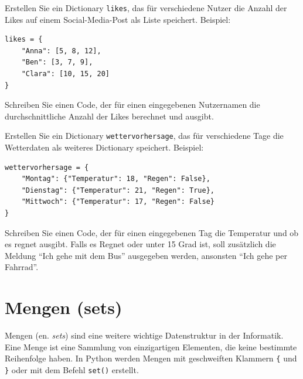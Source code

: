 \begin{myexercise}
	Erstellen Sie ein Dictionary \lstinline|likes|, das für verschiedene Nutzer die Anzahl der Likes auf einem Social-Media-Post als Liste speichert. Beispiel:
	\begin{lstlisting}
likes = {
	"Anna": [5, 8, 12],
	"Ben": [3, 7, 9],
	"Clara": [10, 15, 20]
}
\end{lstlisting}
	Schreiben Sie einen Code, der für einen eingegebenen Nutzernamen die durchschnittliche Anzahl der Likes berechnet und ausgibt.
	\begin{myanswer}
		
	\end{myanswer}
\end{myexercise}

\begin{myexercise}
	Erstellen Sie ein Dictionary \lstinline|wettervorhersage|, das für verschiedene Tage die Wetterdaten als weiteres Dictionary speichert. Beispiel:
	\begin{lstlisting}
wettervorhersage = {
	"Montag": {"Temperatur": 18, "Regen": False},
	"Dienstag": {"Temperatur": 21, "Regen": True},
	"Mittwoch": {"Temperatur": 17, "Regen": False}
}
\end{lstlisting}
	Schreiben Sie einen Code, der für einen eingegebenen Tag die Temperatur und ob es regnet ausgibt. Falls es Regnet oder unter 15 Grad ist, soll zusätzlich die Meldung \enquote{Ich gehe mit dem Bus} ausgegeben werden, ansonsten \enquote{Ich gehe per Fahrrad}.
	\begin{myanswer}
		
	\end{myanswer}
\end{myexercise}

\clearpage
\section{Mengen (sets)}
Mengen (en. \textit{sets}) sind eine weitere wichtige Datenstruktur in der Informatik. Eine Menge ist eine Sammlung von einzigartigen Elementen, die keine bestimmte Reihenfolge haben. In Python werden Mengen mit geschweiften Klammern \lstinline|{| und \lstinline|}| oder mit dem Befehl \lstinline|set()| erstellt.

